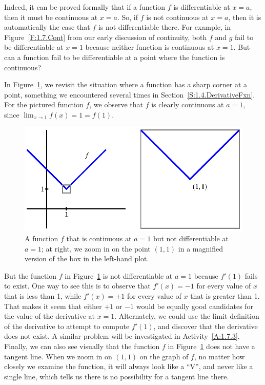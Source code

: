 Indeed, it can be proved formally that if a function $f$ is differentiable at $x = a$, then it must be continuous at $x = a$.  So, if $f$ is not continuous at $x = a$, then it is automatically the case that $f$ is not differentiable there.  For example, in Figure~\ref{F:1.7.Cont} from our early discussion of continuity, both $f$ and $g$ fail to be differentiable at $x = 1$ because neither function is continuous at $x = 1$.  But can a function fail to be differentiable at a point where the function is continuous?

In Figure~\ref{F:1.7.NotDiff}, we revisit the situation where a function has a sharp corner at a point, something we encountered several times in Section~\ref{S:1.4.DerivativeFxn}.  For the pictured function $f$, we observe that $f$ is clearly continuous at $a = 1$, since $\lim_{x \to 1} f(x) = 1 = f(1).$

\begin{figure}[ht]
\begin{center}
\includegraphics{figures/1_7_NotDiff.eps}
\caption{A function $f$ that is continuous at $a = 1$ but not differentiable at $a = 1$; at right, we zoom in on the point $(1,1)$ in a magnified version of the box in the left-hand plot.} \label{F:1.7.NotDiff}
\end{center}
\end{figure}

But the function $f$ in Figure~\ref{F:1.7.NotDiff} is not differentiable at $a = 1$ because $f'(1)$ fails to exist.  One way to see this is to observe that $f'(x) = -1$ for every value of $x$ that is less than 1, while $f'(x) = +1$ for every value of $x$ that is greater than 1.  That makes it seem that either $+1$ or $-1$ would be equally good candidates for the value of the derivative at $x = 1$.   Alternately, we could use the limit definition of the derivative to attempt to compute $f'(1)$, and discover that the derivative does not exist.  A similar problem will be investigated in Activity~\ref{A:1.7.3}.  Finally, we can also see visually that the function $f$ in Figure~\ref{F:1.7.NotDiff} does not have a tangent line.  When we zoom in on $(1,1)$ on the graph of $f$, no matter how closely we examine the function, it will always look like a ``V'', and never like a single line, which tells us there is no possibility for a tangent line there.  

